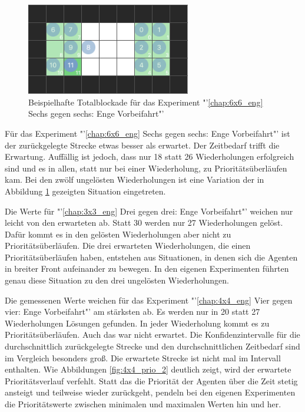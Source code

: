 \begin{figure}[H]
    \includegraphics[height=40mm]{images/6vs6_tight_full_block.png}
    \centering
    \caption{Beispielhafte Totalblockade für das Experiment "'\ref{chap:6x6_eng} Sechs gegen sechs: Enge Vorbeifahrt"'}
    \label{fig:6x6EngFullBlock}
\end{figure}
Für das Experiment "'\ref{chap:6x6_eng} Sechs gegen sechs: Enge Vorbeifahrt"' ist der zurückgelegte Strecke etwas besser als erwartet. Der Zeitbedarf trifft die Erwartung. Auffällig ist jedoch, dass nur 18 statt 26 Wiederholungen erfolgreich sind und es in allen, statt nur bei einer Wiederholung, zu Prioritätsüberläufen kam. Bei den zwölf ungelösten Wiederholungen ist eine Variation der in Abbildung \ref{fig:6x6EngFullBlock} gezeigten Situation eingetreten. 

Die Werte für "'\ref{chap:3x3_eng} Drei gegen drei: Enge Vorbeifahrt"'
weichen nur leicht von den erwarteten ab. Statt 30 werden nur 27 Wiederholungen gelöst. Dafür kommt es in den gelösten Wiederholungen aber nicht zu Prioritätsüberläufen. Die drei erwarteten Wiederholungen, die einen Prioritätsüberläufen haben, entstehen aus Situationen, in denen sich die Agenten in breiter Front aufeinander zu bewegen. In den eigenen Experimenten führten genau diese Situation zu den drei ungelösten Wiederholungen.

Die gemessenen Werte weichen für das Experiment "'\ref{chap:4x4_eng} Vier gegen vier: Enge Vorbeifahrt"' am stärksten ab. Es werden nur in 20 statt 27 Wiederholungen Lösungen gefunden. In jeder Wiederholung kommt es zu Prioritätsüberläufen. Auch das war nicht erwartet. Die Konfidenzintervalle für die durchschnittlich zurückgelegte Strecke und den durchschnittlichen Zeitbedarf sind im Vergleich besonders groß. Die erwartete Strecke ist nicht mal im Intervall enthalten. Wie Abbildungen \ref{fig:4x4_prio_2} deutlich zeigt, wird der erwartete Prioritätsverlauf verfehlt. Statt das die Priorität der Agenten über die Zeit stetig ansteigt und teilweise wieder zurückgeht, pendeln bei den eigenen Experimenten die Prioritätswerte zwischen minimalen und maximalen Werten hin und her.

